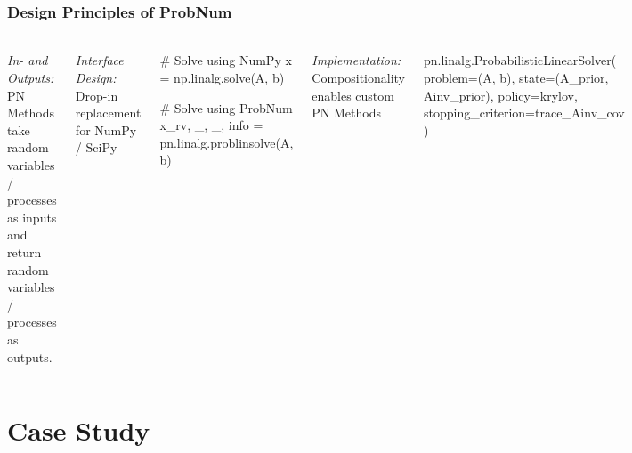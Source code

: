 \documentclass[10pt,usepdftitle=false,aspectratio=169]{beamer}
\begin{document}
\begin{frame}[fragile]\frametitle{Design Principles of ProbNum}
	\framesubtitle{}

	\begin{columns}[totalwidth=\textwidth]

		\emph{In- and Outputs:} PN Methods take random variables / processes as inputs and return random
		variables / processes as outputs.
		\vspace{2ex}

		\emph{Interface Design:} Drop-in replacement for NumPy / SciPy

		\begin{python}
			# Solve using NumPy
			x = np.linalg.solve(A, b)

			# Solve using ProbNum
			x_rv, _, _, info = pn.linalg.problinsolve(A, b)\end{python}
		\vspace{2ex}

		\emph{Implementation:} Compositionality enables custom PN Methods

		\begin{python}
			pn.linalg.ProbabilisticLinearSolver(
			problem=(A, b),
			state=(A_prior, Ainv_prior),
			policy=krylov,
			stopping_criterion=trace_Ainv_cov
			)\end{python}

		\centering
		\vspace{-3ex}
		\href{https://github.com/probabilistic-numerics/probnum/}{\includegraphics[scale=0.3]{figures/probnum_logo_text.png}}

	\end{columns}

\end{frame}

\section{Case Study}
\end{document}
